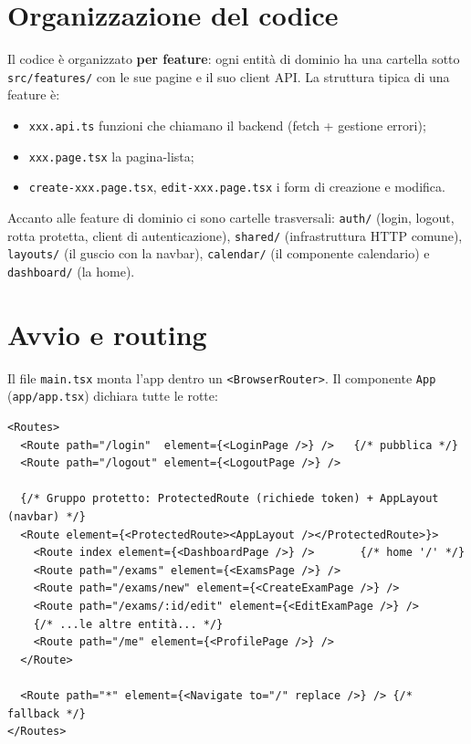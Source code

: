 \documentclass[11pt,a4paper,oneside]{report}
\newcommand{\code}[1]{\texttt{\small #1}}
\newcommand{\file}[1]{\texttt{\small #1}}
\begin{document}
\section{Organizzazione del codice}
Il codice è organizzato \textbf{per feature}: ogni entità di dominio ha una
cartella sotto \file{src/features/} con le sue pagine e il suo client API. La
struttura tipica di una feature è:

\begin{itemize}[leftmargin=1.4em]
  \item \file{xxx.api.ts} \textemdash{} funzioni che chiamano il backend
        (fetch + gestione errori);
  \item \file{xxx.page.tsx} \textemdash{} la pagina-lista;
  \item \file{create-xxx.page.tsx}, \file{edit-xxx.page.tsx} \textemdash{} i form
        di creazione e modifica.
\end{itemize}

Accanto alle feature di dominio ci sono cartelle trasversali: \file{auth/}
(login, logout, rotta protetta, client di autenticazione), \file{shared/}
(infrastruttura HTTP comune), \file{layouts/} (il guscio con la navbar),
\file{calendar/} (il componente calendario) e \file{dashboard/} (la home).

\section{Avvio e routing}
Il file \file{main.tsx} monta l'app dentro un \code{<BrowserRouter>}. Il
componente \code{App} (\file{app/app.tsx}) dichiara tutte le rotte:

\begin{lstlisting}[caption={Struttura delle rotte (estratto di \file{app.tsx}).}]
<Routes>
  <Route path="/login"  element={<LoginPage />} />   {/* pubblica */}
  <Route path="/logout" element={<LogoutPage />} />

  {/* Gruppo protetto: ProtectedRoute (richiede token) + AppLayout (navbar) */}
  <Route element={<ProtectedRoute><AppLayout /></ProtectedRoute>}>
    <Route index element={<DashboardPage />} />       {/* home '/' */}
    <Route path="/exams" element={<ExamsPage />} />
    <Route path="/exams/new" element={<CreateExamPage />} />
    <Route path="/exams/:id/edit" element={<EditExamPage />} />
    {/* ...le altre entità... */}
    <Route path="/me" element={<ProfilePage />} />
  </Route>

  <Route path="*" element={<Navigate to="/" replace />} /> {/* fallback */}
</Routes>
\end{lstlisting}
\end{document}
